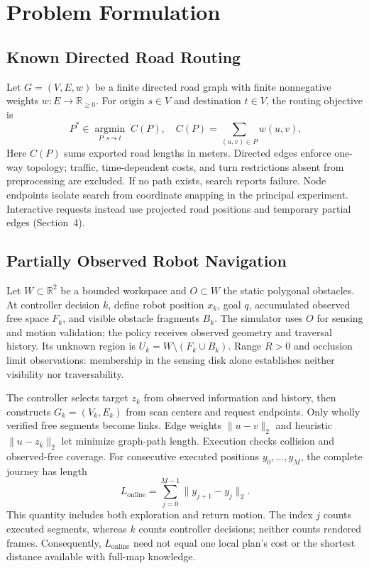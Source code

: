 \section{Problem Formulation}
\subsection{Known Directed Road Routing}
Let $G=(V,E,w)$ be a finite directed road graph with finite nonnegative weights $w:E\to\mathbb{R}_{\geq0}$. For origin $s\in V$ and destination $t\in V$, the routing objective is
\begingroup{}
\begin{equation}
P^*\in\underset{P:s\leadsto t}{\operatorname{argmin}}\;
C(P),\quad C(P)=\sum_{(u,v)\in P}w(u,v).
\end{equation}
\endgroup
Here $C(P)$ sums exported road lengths in meters. Directed edges enforce one-way topology; traffic, time-dependent costs, and turn restrictions absent from preprocessing are excluded. If no path exists, search reports failure. Node endpoints isolate search from coordinate snapping in the principal experiment. Interactive requests instead use projected road positions and temporary partial edges (Section~4).

\subsection{Partially Observed Robot Navigation}
Let $W\subset\mathbb{R}^2$ be a bounded workspace and $O\subset W$ the static polygonal obstacles. At controller decision $k$, define robot position $x_k$, goal $q$, accumulated observed free space $F_k$, and visible obstacle fragments $B_k$. The simulator uses $O$ for sensing and motion validation; the policy receives observed geometry and traversal history. Its unknown region is $U_k=W\setminus(F_k\cup B_k)$. Range $R>0$ and occlusion limit observations: membership in the sensing disk alone establishes neither visibility nor traversability.

The controller selects target $z_k$ from observed information and history, then constructs $G_k=(V_k,E_k)$ from scan centers and request endpoints. Only wholly verified free segments become links. Edge weights $\|u-v\|_2$ and heuristic $\|u-z_k\|_2$ let \astar{} minimize graph-path length. Execution checks collision and observed-free coverage. For consecutive executed positions $y_0,\ldots,y_M$, the complete journey has length
\begin{equation}
L_{\mathrm{online}}=\sum_{j=0}^{M-1}\|y_{j+1}-y_j\|_2.
\end{equation}
This quantity includes both exploration and return motion. The index $j$ counts executed segments, whereas $k$ counts controller decisions; neither counts rendered frames. Consequently, $L_{\mathrm{online}}$ need not equal one local plan's cost or the shortest distance available with full-map knowledge.

